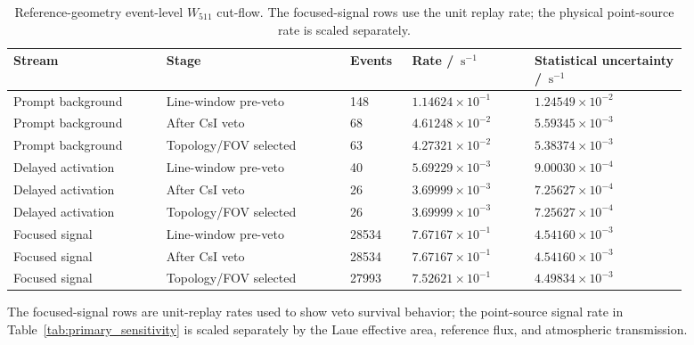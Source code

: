 \documentclass[11pt]{article}
\newcommand{\cps}{\ensuremath{\,\mathrm{s^{-1}}}}
\newcommand{\wii}{W_{511}}
\begin{document}
\begin{table}[t]
\centering
\caption{Reference-geometry event-level $\wii$ cut-flow. The focused-signal rows use the unit replay rate; the physical point-source rate is scaled separately.}
\label{tab:phase2_cutflow}
\footnotesize
{
\setlength{\tabcolsep}{3pt}
\begin{tabular}{p{0.20\linewidth}p{0.24\linewidth}p{0.08\linewidth}p{0.16\linewidth}p{0.20\linewidth}}
\toprule
Stream & Stage & Events & Rate / $\cps$ & Statistical uncertainty / $\cps$ \\
\midrule
Prompt background & Line-window pre-veto & 148 & $1.14624\times10^{-1}$ & $1.24549\times10^{-2}$ \\
Prompt background & After CsI veto & 68 & $4.61248\times10^{-2}$ & $5.59345\times10^{-3}$ \\
Prompt background & Topology/FOV selected & 63 & $4.27321\times10^{-2}$ & $5.38374\times10^{-3}$ \\
Delayed activation & Line-window pre-veto & 40 & $5.69229\times10^{-3}$ & $9.00030\times10^{-4}$ \\
Delayed activation & After CsI veto & 26 & $3.69999\times10^{-3}$ & $7.25627\times10^{-4}$ \\
Delayed activation & Topology/FOV selected & 26 & $3.69999\times10^{-3}$ & $7.25627\times10^{-4}$ \\
Focused signal & Line-window pre-veto & 28534 & $7.67167\times10^{-1}$ & $4.54160\times10^{-3}$ \\
Focused signal & After CsI veto & 28534 & $7.67167\times10^{-1}$ & $4.54160\times10^{-3}$ \\
Focused signal & Topology/FOV selected & 27993 & $7.52621\times10^{-1}$ & $4.49834\times10^{-3}$ \\
\bottomrule
\end{tabular}
\par}
\vspace{0.5ex}
\begin{minipage}{0.94\linewidth}
\footnotesize
The focused-signal rows are unit-replay rates used to show veto survival
behavior; the point-source signal rate in Table~\ref{tab:primary_sensitivity}
is scaled separately by the Laue effective area, reference flux, and atmospheric
transmission.
\end{minipage}
\end{table}
\end{document}
